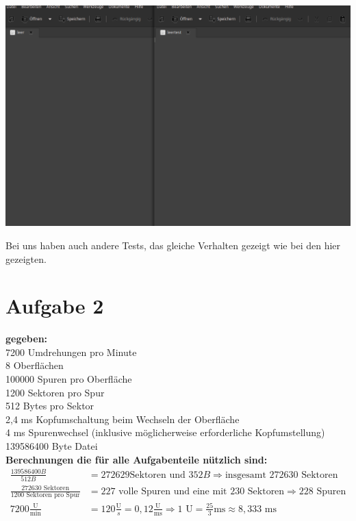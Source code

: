 \documentclass{ti2}
\begin{document}
\includegraphics[width=\textwidth]{ouraufgabe01/leervergleich.png}

Bei uns haben auch andere Tests, das gleiche Verhalten gezeigt wie bei den hier gezeigten.\\
\section*{Aufgabe 2}
\textbf{gegeben:} \\
7200 Umdrehungen pro Minute \\
8 Oberflächen \\
100000 Spuren pro Oberfläche \\
1200 Sektoren pro Spur \\
512 Bytes pro Sektor \\
2,4 ms Kopfumschaltung beim Wechseln der Oberfläche \\
4 ms Spurenwechsel (inklusive möglicherweise erforderliche Kopfumstellung) \\
139586400 Byte Datei \\

\textbf{Berechnungen die für alle Aufgabenteile nützlich sind:}\\
\begin{align*}
\frac{139586400 B}{512 B} &= 272629 \text{Sektoren und } 352 B \Rightarrow \text{insgesamt 272630 Sektoren}\\
\frac{272630 \text{ Sektoren}}{1200 \text{ Sektoren pro Spur}} &= 227 \text{ volle Spuren und eine mit } 230 \text{ Sektoren} \Rightarrow 228 \text{ Spuren} \\
7200 \frac{\text{U}}{\text{min}} &= 120 \frac{\text{U}}{s} = 0,12 \frac{\text{U}}{\text{ms}} \Rightarrow 1 \text{ U} = \frac{25}{3} \text{ms} \approx 8,333 \text{ ms}\\
\end{align*}
\newcommand{\eu}{\frac{25}{3}\text{ms}}
\newcommand{\ms}{\text{ms}}
\end{document}
